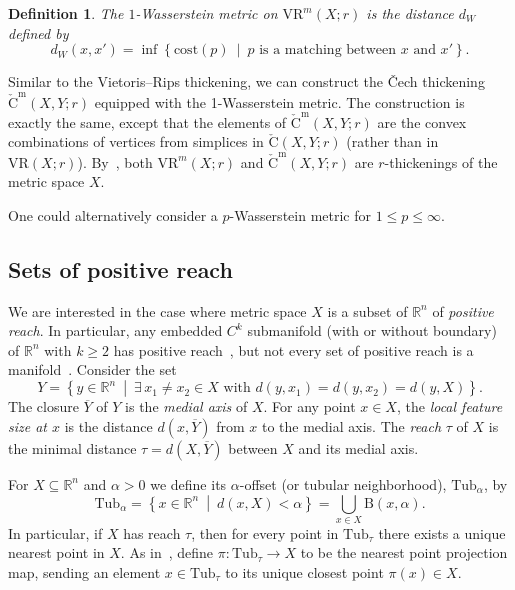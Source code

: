 \documentclass{amsart}
\theoremstyle{plain}
\newtheorem{definition}[lemma]{Definition}
\theoremstyle{definition}
\theoremstyle{myremark}
\newcommand{\R}{\mathbb{R}}
\newcommand{\cost}{\mathrm{cost}}
\newcommand{\ball}[2]{\mathrm{B}(#1,#2)}
\newcommand{\suchthat}{~\middle|~}
\newcommand{\vr}[2]{\mathrm{VR}(#1;#2)}
\newcommand{\vrm}[2]{\mathrm{VR}^m(#1;#2)}
\newcommand{\cecha}[3]{\mathrm{\check{C}}(#1,#2;#3)}
\newcommand{\cecham}[3]{\mathrm{\check{C}^m}(#1,#2;#3)}
\newcommand{\Tub}{\mathrm{Tub}}
\begin{document}
\begin{definition}\label{def:Wasserstein}
The $1$-Wasserstein metric on $\vrm{X}{r}$ is the distance $d_W$ defined by 
\begin{equation*}
d_W(x,x') = \inf \left\{ \cost(p) \suchthat p \text{ is a matching between } x \text{ and } x' \right\}.
\end{equation*}
\end{definition}

Similar to the Vietoris--Rips thickening, we can construct the \v{C}ech thickening $\cecham{X}{Y}{r}$ equipped with the 1-Wasserstein metric.
The construction is exactly the same, except that the elements of $\cecham{X}{Y}{r}$ are the convex combinations of vertices from simplices in $\cecha{X}{Y}{r}$ (rather than in $\vr{X}{r}$).
By~\cite[Lemma~3.5]{MetricReconstructionViaOptimalTransport}, both $\vrm{X}{r}$ and $\cecham{X}{Y}{r}$ are $r$-thickenings of the metric space $X$.

One could alternatively consider a $p$-Wasserstein metric for $1\le p\le \infty$.

\subsection{Sets of positive reach}
We are interested in the case where metric space $X$ is a subset of $\R^n$ of \emph{positive reach}.
In particular, any embedded $C^k$ submanifold (with or without boundary) of $\R^n$ with $k \ge 2$ has positive reach~\cite{Thale}, but not every set of positive reach is a manifold~\cite{FedererCurvature,rataj2017structure}.
Consider the set 
\[
Y = \left\{ y \in \R^n \suchthat \exists\, x_1 \neq x_2 \in X \text{ with } d(y,x_1) = d(y,x_2) = d(y,X) \right\}.
\]
The closure $\overline{Y}$ of $Y$ is the \emph{medial axis} of $X$.
For any point $x \in X$, the \emph{local feature size at $x$} is the distance $d(x,\overline{Y})$ from $x$ to the medial axis.
The \emph{reach} $\tau$ of $X$ is the minimal distance $\tau = d(X,\overline{Y})$ between $X$ and its medial axis.

For $X \subseteq\R^n$ and $\alpha > 0$ we define its $\alpha$-offset (or tubular neighborhood), $\Tub_{\alpha}$, by 
\[
\Tub_{\alpha} = \left\{ x \in \R^n \suchthat d(x,X) < \alpha \right\} = \bigcup_{x \in X} \ball{x}{\alpha} .
\]
In particular, if $X$ has reach $\tau$, then for every point in $\Tub_{\tau}$ there exists a unique nearest point in $X$.
As in~\cite{FedererCurvature,NiyogiSmaleWeinberger}, define $\pi \colon \Tub_{\tau} \to X$ to be the nearest point projection map, sending an element $x\in\Tub_{\tau}$ to its unique closest point $\pi(x)\in X$.
\end{document}
